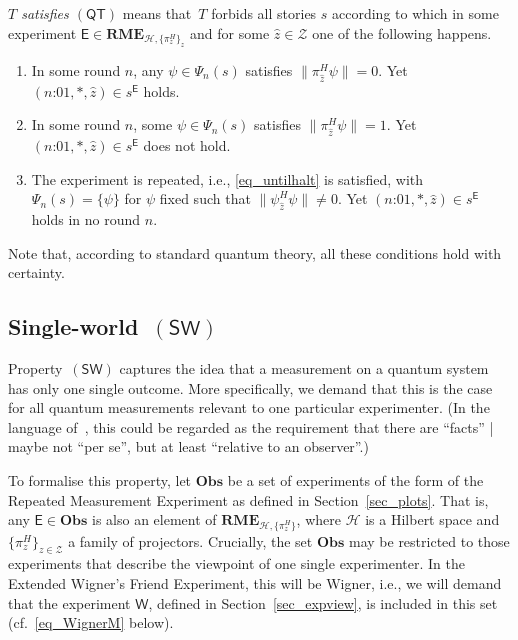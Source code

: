 \documentclass[12pt]{article}
\theoremstyle{plain}
\theoremstyle{definition}
\newcommand*{\cH}{\mathcal{H}}
\newcommand*{\cZ}{\mathcal{Z}}
\newcommand*{\Exp}{\mathsf{E}}
\newcommand*{\Wigner}{\mathsf{W}}
\newcommand*{\BOE}{\mathbf{Obs}}
\newcommand*{\RME}{\mathbf{RME}}
\newcommand*{\QT}{\mathsf{(QT)}}
\newcommand*{\SW}{\mathsf{(SW)}}
\begin{document}
\begin{shaded}
  \noindent \emph{$T$ satisfies $\QT$} means that~$T$ forbids all stories $s$ according to which in some experiment $\Exp \in \RME_{\cH, \{\pi^H_z\}_z}$ and for some $\hat{z} \in \cZ$ one of the following happens. \nobreak
      \begin{enumerate}[label=(\emph{\alph*}),itemindent=0cm,labelsep=0.4em,leftmargin=1.7em]
     \item  In some  round $n$, any $\psi \in \Psi_n(s)$ satisfies $\|\pi^H_{\hat{z}} \psi\| = 0$. Yet $(\text{$n$:01}, *, \hat{z}) \in s^{\Exp}$ holds.  \label{it_QMa}
     \item In some round $n$, some $\psi \in \Psi_n(s)$  satisfies $\|\pi^H_{\hat{z}} \psi\| = 1$. Yet $(\text{$n$:01}, *, \hat{z}) \in s^{\Exp}$ does not hold.  \label{it_QMb}
      \item The experiment is repeated, i.e., \eqref{eq_untilhalt} is satisfied, with $\Psi_n(s) = \{\psi\}$ for $\psi$ fixed such that  $\|\psi^H_{\hat{z}} \psi\| \neq 0$.  Yet $(\text{$n$:01}, *, \hat{z}) \in s^{\Exp}$ holds in no round $n$. \label{it_QMc}
           \end{enumerate}
    \vspace{-1.7ex}
    \end{shaded}
    
 Note that, according to standard quantum theory, all these conditions hold with certainty. 
   

\subsection{Single-world~$\SW$}

Property~$\SW$ captures the idea that a measurement on a quantum system has only one single outcome. More specifically, we demand that this is the case for all quantum measurements relevant to one particular experimenter. (In the language of~\cite{Brukner15}, this could be regarded as the requirement that there are ``facts'' | maybe not ``per se'', but at least ``relative to an observer''.) 

To formalise this property, let $\BOE$ be a set of experiments of the form of the Repeated Measurement Experiment as defined in Section~\ref{sec_plots}. That is, any $\Exp \in \BOE$ is also an element of $\RME_{\cH, \{\pi^H_z\}}$, where $\cH$  is a Hilbert space and $\{\pi^H_z\}_{z \in \cZ}$ a family of projectors. Crucially, the set $\BOE$ may be restricted to those experiments that describe the viewpoint of one single experimenter. In the Extended Wigner's Friend Experiment, this will be Wigner, i.e., we will demand that the experiment $\Wigner$, defined in Section~\ref{sec_expview}, is included in this set (cf.\ \eqref{eq_WignerM} below). 
\end{document}
